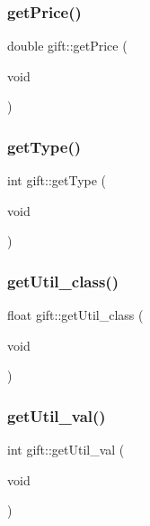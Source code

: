 \subsubsection{\texorpdfstring{get\+Price()}{getPrice()}}
{\footnotesize\ttfamily double gift\+::get\+Price (\begin{DoxyParamCaption}\item[{void}]{ }\end{DoxyParamCaption})}

\mbox{\label{classgift_a820ca25bbee4873ef9b0e82ca2f73ad3}} 
\subsubsection{\texorpdfstring{get\+Type()}{getType()}}
{\footnotesize\ttfamily int gift\+::get\+Type (\begin{DoxyParamCaption}\item[{void}]{ }\end{DoxyParamCaption})}

\mbox{\label{classgift_a2bb6e0ed9bb5c1f98d47660d39ebf3f8}} 
\subsubsection{\texorpdfstring{get\+Util\+\_\+class()}{getUtil\_class()}}
{\footnotesize\ttfamily float gift\+::get\+Util\+\_\+class (\begin{DoxyParamCaption}\item[{void}]{ }\end{DoxyParamCaption})}

\mbox{\label{classgift_a5e2d84e4d1fe8c00903a71195fc41487}} 
\subsubsection{\texorpdfstring{get\+Util\+\_\+val()}{getUtil\_val()}}
{\footnotesize\ttfamily int gift\+::get\+Util\+\_\+val (\begin{DoxyParamCaption}\item[{void}]{ }\end{DoxyParamCaption})}

